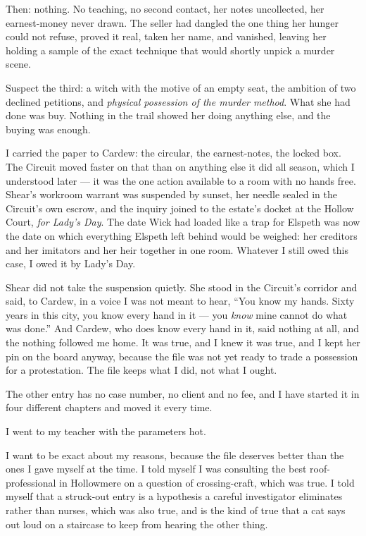 Then: nothing. No teaching, no second contact, her notes uncollected, her earnest-money never drawn. The seller had dangled the one thing her hunger could not refuse, proved it real, taken her name, and vanished, leaving her holding a sample of the exact technique that would shortly unpick a murder scene.

Suspect the third: a witch with the motive of an empty seat, the ambition of two declined petitions, and \emph{physical possession of the murder method}. What she had done was buy. Nothing in the trail showed her doing anything else, and the buying was enough.

I carried the paper to Cardew: the circular, the earnest-notes, the locked box. The Circuit moved faster on that than on anything else it did all season, which I understood later --- it was the one action available to a room with no hands free. Shear's workroom warrant was suspended by sunset, her needle sealed in the Circuit's own escrow, and the inquiry joined to the estate's docket at the Hollow Court, \emph{for Lady's Day}. The date Wick had loaded like a trap for Elspeth was now the date on which everything Elspeth left behind would be weighed: her creditors and her imitators and her heir together in one room. Whatever I still owed this case, I owed it by Lady's Day.

Shear did not take the suspension quietly. She stood in the Circuit's corridor and said, to Cardew, in a voice I was not meant to hear, ``You know my hands. Sixty years in this city, you know every hand in it --- you \emph{know} mine cannot do what was done.'' And Cardew, who does know every hand in it, said nothing at all, and the nothing followed me home. It was true, and I knew it was true, and I kept her pin on the board anyway, because the file was not yet ready to trade a possession for a protestation. The file keeps what I did, not what I ought.

\scenebreak

The other entry has no case number, no client and no fee, and I have started it in four different chapters and moved it every time.

I went to my teacher with the parameters hot.

I want to be exact about my reasons, because the file deserves better than the ones I gave myself at the time. I told myself I was consulting the best roof-professional in Hollowmere on a question of crossing-craft, which was true. I told myself that a struck-out entry is a hypothesis a careful investigator eliminates rather than nurses, which was also true, and is the kind of true that a cat says out loud on a staircase to keep from hearing the other thing.

